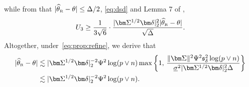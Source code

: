 \documentclass[11pt, a4paper]{article}
\renewcommand{\l}{\left}
\renewcommand{\r}{\right}
\def\wh{\widehat}
\newcommand{\cp}{\theta}
\newcommand{\Rf}{\text{\tiny \upshape R}} %
\theoremstyle{definition}
\theoremstyle{definition}
\theoremstyle{definition}
\theoremstyle{definition}
\theoremstyle{definition}
\theoremstyle{remark}
\theoremstyle{definition}
\theoremstyle{definition}
\theoremstyle{definition}
\begin{document}
while from that $\vert \wh\cp_{\Rf} - \cp \vert \le \Delta/2$, \eqref{eq:dsd} and Lemma 7 of \cite{wang2018high},
\begin{align*}
U_3 \ge \frac{1}{3\sqrt{6}} \cdot \frac{\vert \bm\Sigma^{1/2} \bm\delta \vert_2^2 \vert \wh{\cp}_{\Rf} - \cp \vert}{\sqrt{\Delta}}.
\end{align*}
Altogether, under~\eqref{eq:prop:refine}, we derive that
\begin{align*}
\vert \wh{\cp}_{\Rf} - \cp \vert &\lesssim \vert \bm\Sigma^{1/2} \bm\delta \vert_2^{-2} \Psi^2 \log(p \vee n) \max\l\{ 1, \, \frac{ \Vert \bm\Sigma \Vert^2 \Psi^2 \mathfrak{s}_\delta^2 \log(p \vee n)}{ \underline{\sigma}^2 \vert \bm\Sigma^{1/2} \bm\delta \vert_2^2 \Delta } \r\}
\\
&\lesssim \vert \bm\Sigma^{1/2} \bm\delta \vert_2^{-2} \Psi^2 \log(p \vee n).
\end{align*}
\end{document}
